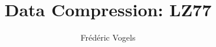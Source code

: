 \documentclass{../ucll-slides}
\title{Data Compression: LZ77}
\author{Fr\'ed\'eric Vogels}
\begin{document}
\begin{frame}
  \titlepage
\end{frame}



\end{document}
